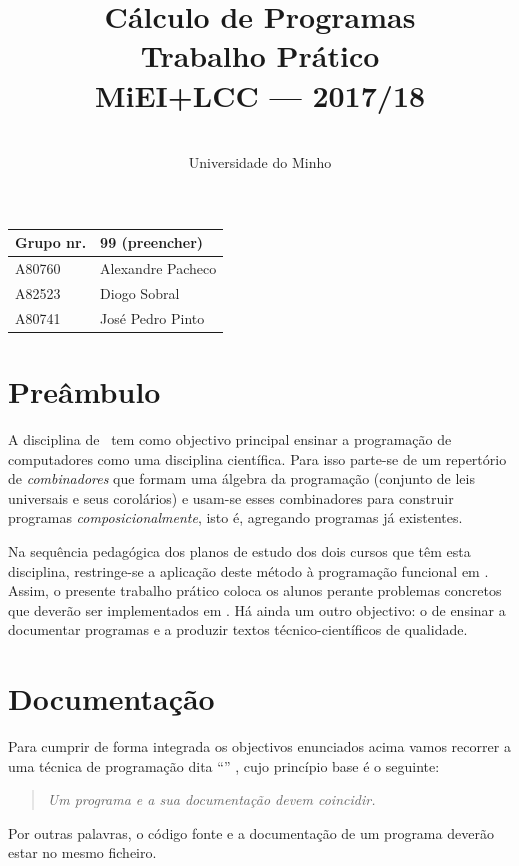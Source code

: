 \documentclass[a4paper]{article}
\title{
            Cálculo de Programas
\\
        Trabalho Prático
\\
        MiEI+LCC --- 2017/18
}
\author{
        \dium
\\
        Universidade do Minho
}
\date\mydate
\begin{document}
\maketitle

\begin{center}\large
\begin{tabular}{ll}
\textbf{Grupo} nr. & 99 (preencher)
\\\hline
A80760 & Alexandre Pacheco
\\
A82523 & Diogo Sobral
\\
A80741 & José Pedro Pinto
\end{tabular}
\end{center}

\section{Preâmbulo}

A disciplina de \CP\ tem como objectivo principal ensinar
a progra\-mação de computadores como uma disciplina científica. Para isso
parte-se de um repertório de \emph{combinadores} que formam uma álgebra da
programação (conjunto de leis universais e seus corolários) e usam-se esses
combinadores para construir programas \emph{composicionalmente}, isto é,
agregando programas já existentes.

Na sequência pedagógica dos planos de estudo dos dois cursos que têm esta
disciplina, restringe-se a aplicação deste método à programação funcional
em \Haskell. Assim,
o presente trabalho prático coloca os alunos perante problemas
concretos que deverão ser implementados em \Haskell.
Há ainda um outro objectivo: o de ensinar a documentar programas e
a produzir textos técnico-científicos de qualidade.

\section{Documentação}
Para cumprir de forma integrada os objectivos enunciados acima vamos recorrer
a uma técnica de programa\-ção dita ``'' \cite{Kn92}, cujo
princípio base é o seguinte:
\begin{quote}\em
Um programa e a sua documentação devem coincidir.
\end{quote}
Por outras palavras, o código fonte e a documentação de um programa deverão estar no
mesmo ficheiro.
\end{document}
